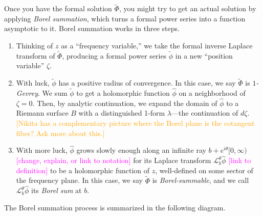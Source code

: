 \documentclass{article}
\newcommand{\series}[1]{\tilde{#1}}
\newcommand{\laplace}{\mathcal{L}}
\begin{document}
Once you have the formal solution $\series{\Phi}$, you might try to get an actual solution by applying {\em Borel summation}, which turns a formal power series into a function asymptotic to it. Borel summation works in three steps.
\begin{enumerate}
\item Thinking of $z$ as a ``frequency variable,'' we take the formal inverse Laplace transform of $\series{\Phi}$, producing a formal power series $\series{\phi}$ in a new ``position variable'' $\zeta$.
\item With luck, $\series{\phi}$ has a positive radius of convergence. In this case, we say $\series{\Phi}$ is {\em $1$-Gevrey}. We sum $\series{\phi}$ to get a holomorphic function $\hat{\phi}$ on a neighborhood of $\zeta = 0$. Then, by analytic continuation, we expand the domain of $\hat{\phi}$ to a Riemann surface $B$ with a distinguished 1-form $\lambda$---the continuation of $d\zeta$. \textcolor{orange}{[Nikita has a complementary picture where the Borel plane is the cotangent fiber? Ask more about this.]}
\item With more luck, $\hat{\phi}$ grows slowly enough along an infinite ray $b + e^{i\theta}[0, \infty)$ \textcolor{magenta}{[change, explain, or link to notation]} for its Laplace transform $\laplace_b^\theta \hat{\phi}$ \textcolor{magenta}{[link to definition]} to be a holomorphic function of $z$, well-defined on some sector of the frequency plane. In this case, we say $\tilde{\Phi}$ is {\em Borel-summable}, and we call $\laplace_b^\theta \hat{\phi}$ its {\em Borel sum} at $b$.
\end{enumerate}
The Borel summation process is summarized in the following diagram.
\begin{center}
\end{center}
\end{document}
